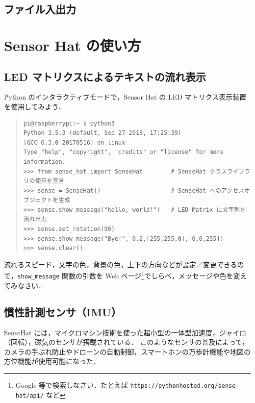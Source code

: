 \documentclass[11pt,a4,epsf]{article}
\begin{document}
\subsection{ファイル入出力}


\section{Sensor Hat の使い方}

\subsection{LED マトリクスによるテキストの流れ表示}

Python のインタラクティブモードで，Sensor Hat の LED マトリクス表示装置を使用してみよう．
\begin{quote}
\small
\begin{verbatim}
pi@raspberrypi:~ $ python3
Python 3.5.3 (default, Sep 27 2018, 17:25:39) 
[GCC 6.3.0 20170516] on linux
Type "help", "copyright", "credits" or "license" for more information.
>>> from sense_hat import SenseHat        # SenseHat クラスライブラリの使用を宣言
>>> sense = SenseHat()                    # SenseHat へのアクセスオブジェクトを生成
>>> sense.show_message("hello, world!")   # LED Matrix に文字列を流れ出力
>>> sense.set_rotation(90)
>>> sense.show_message("Bye!", 0.2,[255,255,0],[0,0,255])
>>> sense.clear()
\end{verbatim}
\end{quote}

\begin{excercise}
流れるスピード，文字の色，背景の色，上下の方向などが設定／変更できるので，\verb+show_message+ 関数の引数を Web ページ\footnote{Google 等で検索しなさい．たとえば {\tt https://pythonhosted.org/sense-hat/api/} など}でしらべ，メッセージや色を変えてみなさい．
\end{excercise}

\subsection{慣性計測センサ（IMU）}

SenseHat には，マイクロマシン技術を使った超小型の一体型加速度，ジャイロ（回転），磁気のセンサが搭載されている．
このようなセンサの普及によって，カメラの手ぶれ防止やドローンの自動制御，スマートホンの万歩計機能や地図の方位機能が使用可能になった．
\end{document}
